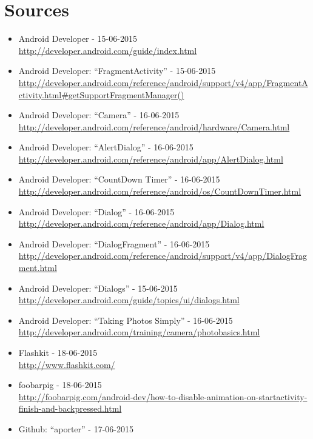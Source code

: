 \section{Sources}
\begin{itemize}
	\item Android Developer - 15-06-2015 \\ \url{http://developer.android.com/guide/index.html}
	\item Android Developer: “FragmentActivity” - 15-06-2015 \\ \url{http://developer.android.com/reference/android/support/v4/app/FragmentActivity.html#getSupportFragmentManager()}
	\item Android Developer: “Camera” - 16-06-2015 \\ \url{http://developer.android.com/reference/android/hardware/Camera.html}
	\item Android Developer: “AlertDialog” - 16-06-2015 \\ \url{http://developer.android.com/reference/android/app/AlertDialog.html}
	\item Android Developer: “CountDown Timer” - 16-06-2015 \\ \url{http://developer.android.com/reference/android/os/CountDownTimer.html}
	\item Android Developer: “Dialog” - 16-06-2015 \\ \url{http://developer.android.com/reference/android/app/Dialog.html}
	\item Android Developer: “DialogFragment” - 16-06-2015 \\ \url{http://developer.android.com/reference/android/support/v4/app/DialogFragment.html}
	\item Android Developer: “Dialogs” - 15-06-2015 \\ \url{http://developer.android.com/guide/topics/ui/dialogs.html }
	\item Android Developer: “Taking Photos Simply” - 16-06-2015 \\ \url{http://developer.android.com/training/camera/photobasics.html}
	\item Flashkit - 18-06-2015 \\
	\url{http://www.flashkit.com/}
	\item foobarpig - 18-06-2015 \\
	\url{http://foobarpig.com/android-dev/how-to-disable-animation-on-startactivity-finish-and-backpressed.html}
	\item Github: “aporter” - 17-06-2015 \\

\end{itemize}
